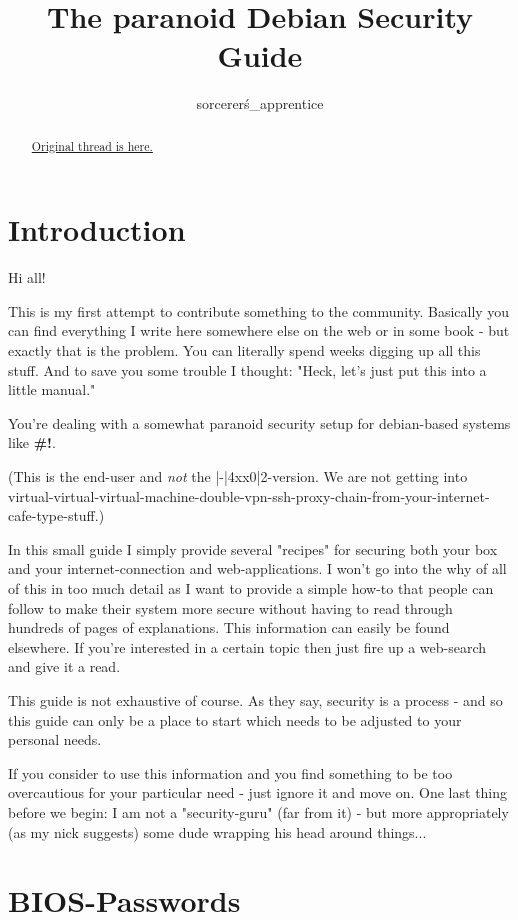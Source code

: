 \documentclass{article}
\title{The paranoid Debian Security Guide}
\author{sorcerer\'s\_apprentice}
\begin{document}
\maketitle
\begin{abstract}
 \href{http://crunchbang.org/forums/viewtopic.php?id=24722}{Original thread is here.}
\end{abstract}


\tableofcontents

\section{Introduction}

 Hi all!


 This is my first attempt to contribute something to the community. Basically you can find everything I write here somewhere else on the web or in some book - but exactly that is the problem. You can literally spend weeks digging up all this stuff. And to save you some trouble I thought: "Heck, let's just put this into a little manual."


 You're dealing with a somewhat paranoid security setup for debian-based systems like \textbf{\#!}. 

(This is the end-user and \emph{not} the |-|4xx0|2-version. We are not getting into virtual-virtual-virtual-machine-double-vpn-ssh-proxy-chain-from-your-internet-cafe-type-stuff.)


 In this small guide I simply provide several "recipes" for securing both your box and your internet-connection and web-applications. I won't go into the why of all of this in too much detail as I want to provide a simple how-to that people can follow to make their system more secure without having to read through hundreds of pages of explanations. This information can easily be found elsewhere. If you're interested in a certain topic then just fire up a web-search and give it a read. 


 This guide is not exhaustive of course. As they say, security is a process - and so this guide can only be a place to start which needs to be adjusted to your personal needs. 


 If you consider to use this information and you find something to be too overcautious for your particular need - just ignore it and move on. One last thing before we begin: I am not a "security-guru" (far from it) - but more appropriately (as my nick suggests) some dude wrapping his head around things... 
\section{BIOS-Passwords}
\end{document}
